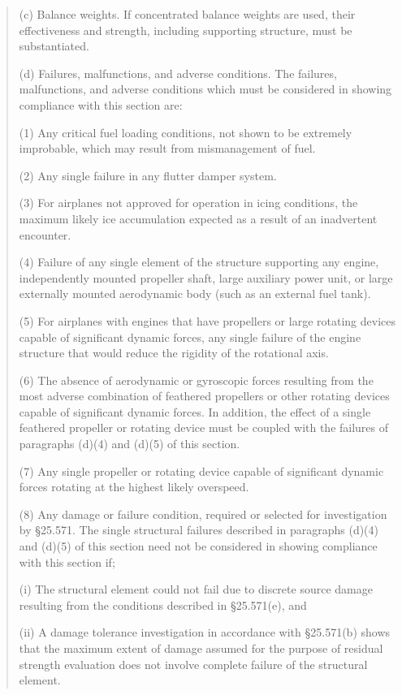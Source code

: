 \begin{quotation}
\begin{scriptsize}
(c) Balance weights. If concentrated balance weights are used, their effectiveness and strength, including supporting structure, must be substantiated.

(d) Failures, malfunctions, and adverse conditions. The failures, malfunctions, and adverse conditions which must be considered in showing compliance with this section are:

(1) Any critical fuel loading conditions, not shown to be extremely improbable, which may result from mismanagement of fuel.

(2) Any single failure in any flutter damper system.

(3) For airplanes not approved for operation in icing conditions, the maximum likely ice accumulation expected as a result of an inadvertent encounter.

(4) Failure of any single element of the structure supporting any engine, independently mounted propeller shaft, large auxiliary power unit, or large externally mounted aerodynamic body (such as an external fuel tank).

(5) For airplanes with engines that have propellers or large rotating devices capable of significant dynamic forces, any single failure of the engine structure that would reduce the rigidity of the rotational axis.

(6) The absence of aerodynamic or gyroscopic forces resulting from the most adverse combination of feathered propellers or other rotating devices capable of significant dynamic forces. In addition, the effect of a single feathered propeller or rotating device must be coupled with the failures of paragraphs (d)(4) and (d)(5) of this section.

(7) Any single propeller or rotating device capable of significant dynamic forces rotating at the highest likely overspeed.

(8) Any damage or failure condition, required or selected for investigation by §25.571. The single structural failures described in paragraphs (d)(4) and (d)(5) of this section need not be considered in showing compliance with this section if;

(i) The structural element could not fail due to discrete source damage resulting from the conditions described in §25.571(e), and

(ii) A damage tolerance investigation in accordance with §25.571(b) shows that the maximum extent of damage assumed for the purpose of residual strength evaluation does not involve complete failure of the structural element.


\end{scriptsize}
\end{quotation}
